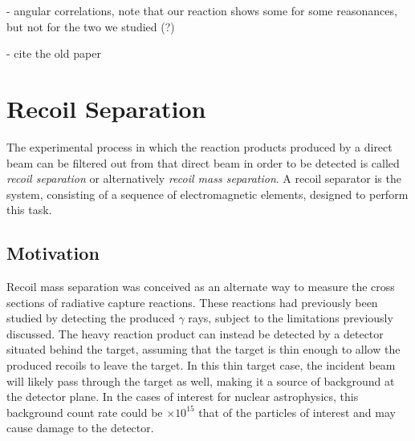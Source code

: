 - angular correlations, note that our reaction shows some for some reasonances,
  but not for the two we studied (?)

- cite the old paper



\section{Recoil Separation}
\label{sec:ch01-recoil-separation}

The experimental process in which the reaction products produced by a direct
beam can be filtered out from that direct beam in order to be detected is
called \emph{recoil separation} or alternatively \emph{recoil mass separation}.
A recoil separator is the system, consisting of a sequence of electromagnetic
elements, designed to perform this task.

\subsection{Motivation}
\label{ssec:recoil-separation-motivation}

Recoil mass separation was conceived as an alternate way to measure the cross
sections of radiative capture reactions. These reactions had previously been
studied by detecting the produced $\gamma$ rays, subject to the limitations
previously discussed. The heavy reaction product can instead be detected by a
detector situated behind the target, assuming that the target is thin enough to
allow the produced recoils to leave the target. In this thin target case, the
incident beam will likely pass through the target as well, making it a source
of background at the detector plane. In the cases of interest for nuclear
astrophysics, this background count rate could be $\times 10^{15}$ that of the
particles of interest and may cause damage to the detector.

